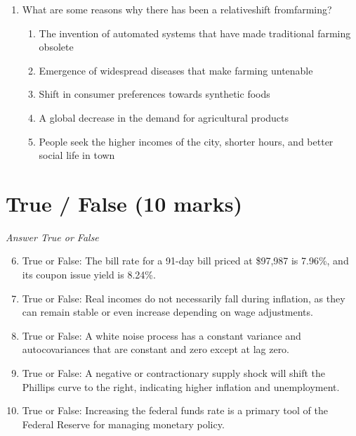 \documentclass[12pt]{article}
\begin{document}
\begin{enumerate}[label=\arabic*.]
\begin{enumerate}[label=(\alph*)]
    \item saving remains constant.
    \item consumption decreases by more than \$X.
    \item saving increases by exactly \$X .
    \item saving increases by less than \$X .
    \item consumption decreases by less than \$X.
\end{enumerate}
\item What are some reasons why there has been a relativeshift fromfarming?
\begin{enumerate}[label=(\alph*)]
    \item The invention of automated systems that have made traditional farming obsolete
    \item Emergence of widespread diseases that make farming untenable
    \item Shift in consumer preferences towards synthetic foods
    \item A global decrease in the demand for agricultural products
    \item People seek the higher incomes of the city, shorter hours, and better social life in town
\end{enumerate}
\end{enumerate}

\section*{True / False (10 marks)}
\textit{Answer True or False}
\begin{enumerate}[label=\arabic*.]
\setcounter{enumi}{5}
\item True or False: The bill rate for a 91-day bill priced at \$97,987 is 7.96\%, and its coupon issue yield is 8.24\%.
\item True or False: Real incomes do not necessarily fall during inflation, as they can remain stable or even increase depending on wage adjustments.
\item True or False: A white noise process has a constant variance and autocovariances that are constant and zero except at lag zero.
\item True or False: A negative or contractionary supply shock will shift the Phillips curve to the right, indicating higher inflation and unemployment.
\item True or False: Increasing the federal funds rate is a primary tool of the Federal Reserve for managing monetary policy.
\end{enumerate}
\end{document}

